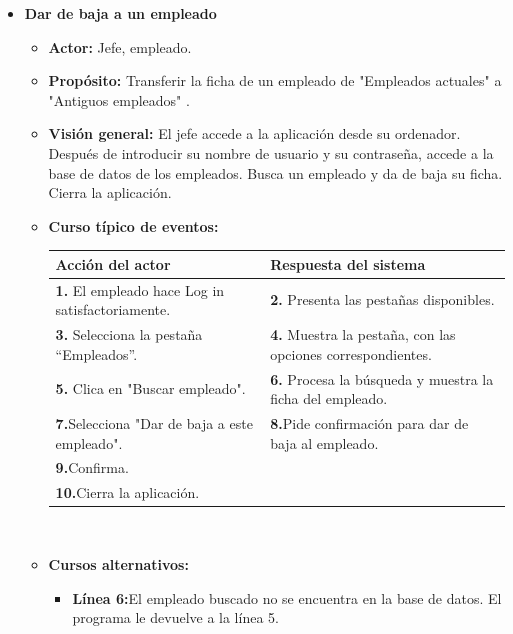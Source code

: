 \documentclass[spanish,a4paper,12pt]{report}		%
\begin{document}
\begin{itemize}

	\item \textbf{Dar de baja a un empleado}		%
			\begin{itemize}
			\item \textbf{Actor:} Jefe, empleado.
			\item \textbf{Propósito: } Transferir la ficha de un empleado de "Empleados actuales" a "Antiguos empleados" .
			\item \textbf{Visión general:} El jefe accede a la aplicación desde su ordenador. Después de introducir su nombre de usuario y su contraseña, accede a la base de datos de los empleados. Busca un empleado y da de baja su ficha. Cierra la aplicación. 
			\item \textbf{Curso típico de eventos:} 	\\
				\begin{tabular}{|p{6cm}||p{6cm}|}
				\hline
				\textbf{Acción del actor} & \textbf{Respuesta del sistema} \\ \hline \hline
				\textbf{1.}   El empleado hace Log in satisfactoriamente. & \textbf{2.} Presenta las pestañas disponibles.\\ \hline
				\textbf{3.} Selecciona la pestaña “Empleados”. & \textbf{4.} Muestra la pestaña, con las opciones correspondientes. \\ \hline
				\textbf{5.} Clica en "Buscar empleado".	& \textbf{6.} Procesa la búsqueda y muestra la ficha del empleado. \\ \hline
				\textbf{7.}Selecciona "Dar de baja a este empleado". & \textbf{8.}Pide confirmación para dar de baja al empleado.\\ \hline
				\textbf{9.}Confirma. & \textbf{} \\ \hline
				\textbf{10.}Cierra la aplicación. & \textbf{} \\ \hline
			\end{tabular}
			\\
			\item \textbf{Cursos alternativos:} 
			\begin{itemize}
			\item  \textbf{Línea 6:}El empleado buscado no se encuentra en la base de datos. El programa le devuelve a la línea 5.
			\end {itemize}
		\end{itemize}%



\end{itemize}
\end{document}
